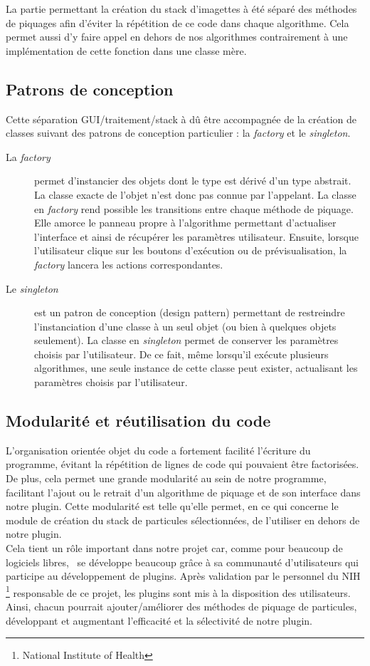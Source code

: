 La partie permettant la création du stack d'imagettes à été séparé des méthodes de piquages afin d'éviter la répétition de ce code dans chaque algorithme. Cela permet aussi d'y faire appel en dehors de nos algorithmes contrairement à une implémentation de cette fonction dans une classe mère.

\subsection{Patrons de conception}

Cette séparation GUI/traitement/stack à dû être accompagnée de la création de classes suivant des patrons de conception particulier : la \emph{factory} et le \emph{singleton}. 
\begin{description}
\item[La \emph{factory}] permet d'instancier des objets dont le type est dérivé d'un type abstrait. La classe exacte de l'objet n'est donc pas connue par l'appelant. La classe en \emph{factory} rend possible les transitions entre chaque méthode de piquage. Elle amorce le panneau propre à l'algorithme permettant d'actualiser l'interface et ainsi de récupérer les paramètres utilisateur. Ensuite, lorsque l'utilisateur clique sur les boutons d'exécution ou de prévisualisation, la \emph{factory} lancera les actions correspondantes.
\item [Le \emph{singleton}] est un patron de conception (design pattern) permettant de restreindre l'instanciation d'une classe à un seul objet (ou bien à quelques objets seulement). La classe en \emph{singleton} permet de conserver les paramètres choisis par l'utilisateur. De ce fait, même lorsqu'il exécute plusieurs algorithmes, une seule instance de cette classe peut exister, actualisant les paramètres choisis par l'utilisateur.
\end{description}


\subsection{Modularité et réutilisation du code}

L'organisation orientée objet du code a fortement facilité l'écriture du programme, évitant la répétition de lignes de code qui pouvaient \^etre factorisées. De plus, cela permet une grande modularité au sein de notre programme, facilitant l'ajout ou le retrait d'un algorithme de piquage et de son interface dans notre plugin. Cette modularité est telle qu'elle permet, en ce qui concerne le module de création du stack de particules sélectionnées, de l'utiliser en dehors de notre plugin.\\
Cela tient un rôle important dans notre projet car, comme pour beaucoup de logiciels libres, \imj ~se développe beaucoup gr\^ace à sa communauté d'utilisateurs qui participe au développement de plugins. Après validation par le personnel du NIH \footnote{National Institute of Health} responsable de ce projet, les plugins sont mis à la disposition des utilisateurs. Ainsi, chacun pourrait ajouter/améliorer des méthodes de piquage de particules, développant et augmentant l'efficacité et la sélectivité de notre plugin. \\

